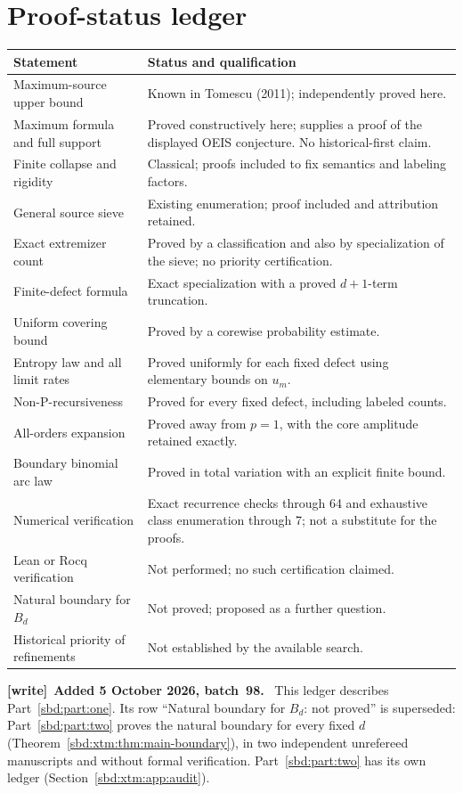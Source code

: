 \documentclass[11pt,a4paper]{article}
\theoremstyle{definition}
\newenvironment{writenote}[1][]{\par\smallskip\begingroup\small
 \noindent\textbf{[write]}\if\relax\detokenize{#1}\relax\else~\textbf{#1.}\fi\ }%
 {\par\endgroup\smallskip}
\begin{document}
\section{Proof-status ledger}
\begin{longtable}{p{}p{}}
\toprule
Statement & Status and qualification\\
\midrule\endhead
Maximum-source upper bound & Known in Tomescu (2011); independently proved here.\\
Maximum formula and full support & Proved constructively here; supplies a proof of the displayed OEIS conjecture. No historical-first claim.\\
Finite collapse and rigidity & Classical; proofs included to fix semantics and labeling factors.\\
General source sieve & Existing enumeration; proof included and attribution retained.\\
Exact extremizer count & Proved by a classification and also by specialization of the sieve; no priority certification.\\
Finite-defect formula & Exact specialization with a proved $d+1$-term truncation.\\
Uniform covering bound & Proved by a corewise probability estimate.\\
Entropy law and all limit rates & Proved uniformly for each fixed defect using elementary bounds on $u_m$.\\
Non-P-recursiveness & Proved for every fixed defect, including labeled counts.\\
All-orders expansion & Proved away from $p=1$, with the core amplitude retained exactly.\\
Boundary binomial arc law & Proved in total variation with an explicit finite bound.\\
Numerical verification & Exact recurrence checks through 64 and exhaustive class enumeration through 7; not a substitute for the proofs.\\
Lean or Rocq verification & Not performed; no such certification claimed.\\
Natural boundary for $B_d$ & Not proved; proposed as a further question.\\
Historical priority of refinements & Not established by the available search.\\
\bottomrule
\end{longtable}

\begin{writenote}[Added 5 October 2026, batch~98]
This ledger describes Part~\ref{sbd:part:one}. Its row ``Natural boundary
for $B_d$: not proved'' is superseded: Part~\ref{sbd:part:two} proves the
natural boundary for every fixed $d$
(Theorem~\ref{sbd:xtm:thm:main-boundary}), in two independent unrefereed
manuscripts and without formal verification. Part~\ref{sbd:part:two} has
its own ledger (Section~\ref{sbd:xtm:app:audit}).
\end{writenote}
\end{document}
